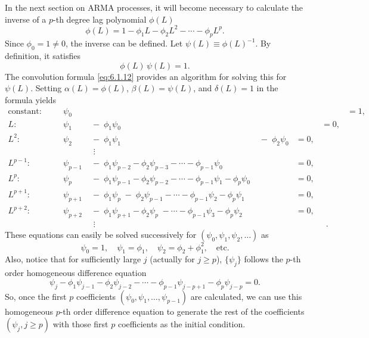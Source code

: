 In the next section on ARMA processes, it will become necessary to calculate the
inverse of a $p$-th degree lag polynomial $\phi(L)$
\[
  \phi(L) = 1 - \phi_1 L - \phi_2 L^2 - \cdots - \phi_p L^p.
\]
Since $\phi_0 = 1 \neq 0$, the inverse can be defined. Let $\psi(L) \equiv \phi(L)^{-1}$. By definition,
it satisfies
\[
  \phi(L)\,\psi(L) = 1.
\]
The convolution formula \eqref{eq:6.1.12} provides an algorithm for solving this for $\psi(L)$.
Setting $\alpha(L) = \phi(L)$, $\beta(L) = \psi(L)$, and $\delta(L) = 1$ in the formula yields
\begin{equation}
\begin{alignedat}{5}
  \text{constant:}&\quad & \psi_0 && && &= 1, \\
  L\text{:}&\quad & \psi_1 &\;-\; \phi_1 \psi_0 && &= 0, \\
  L^2\text{:}&\quad & \psi_2 &\;-\; \phi_1 \psi_1 &\;-\; \phi_2 \psi_0 &= 0, \\
  &\quad & &\;\;\vdots && \\
  L^{p-1}\text{:}&\quad & \psi_{p-1} &\;-\; \phi_1 \psi_{p-2} - \phi_2 \psi_{p-3} - \cdots - \phi_{p-1} \psi_0 &\quad &= 0, \\
  L^p\text{:}&\quad & \psi_p &\;-\; \phi_1 \psi_{p-1} - \phi_2 \psi_{p-2} - \cdots - \phi_{p-1} \psi_1 - \phi_p \psi_0 &\quad &= 0, \\
  L^{p+1}\text{:}&\quad & \psi_{p+1} &\;-\; \phi_1 \psi_p \;-\; \phi_2 \psi_{p-1} - \cdots - \phi_{p-1} \psi_2 - \phi_p \psi_1 &\quad &= 0, \\
  L^{p+2}\text{:}&\quad & \psi_{p+2} &\;-\; \phi_1 \psi_{p+1} - \phi_2 \psi_p \;- \cdots - \phi_{p-1} \psi_3 - \phi_p \psi_2 &\quad &= 0, \\
  &\quad & &\;\;\vdots && &\;\;.
\end{alignedat}
\label{eq:6.1.16}
\end{equation}
These equations can easily be solved successively for $(\psi_0, \psi_1, \psi_2, \ldots)$ as
\[
  \psi_0 = 1, \quad \psi_1 = \phi_1, \quad \psi_2 = \phi_2 + \phi_1^2, \quad \text{etc.}
\]
Also, notice that for sufficiently large $j$ (actually for $j \geq p$), $\{\psi_j\}$ follows the $p$-th
order homogeneous difference equation
\begin{equation}
  \psi_j - \phi_1 \psi_{j-1} - \phi_2 \psi_{j-2} - \cdots - \phi_{p-1} \psi_{j-p+1} - \phi_p \psi_{j-p} = 0.
  \label{eq:6.1.17}
\end{equation}
So, once the first $p$ coefficients $(\psi_0, \psi_1, \ldots, \psi_{p-1})$ are calculated, we can use this
homogeneous $p$-th order difference equation to generate the rest of the coefficients
$(\psi_j, j \geq p)$ with those first $p$ coefficients as the initial condition.

